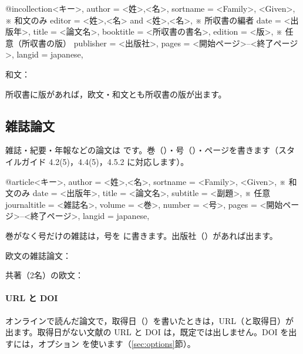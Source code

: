 \begin{bibtemplate}
@incollection{<キー>,
  author    = {<姓>,<名>},
  sortname  = {<Family>, <Given>},   ※ 和文のみ
  editor    = {<姓>,<名> and <姓>,<名>},   ※ 所収書の編者
  date      = {<出版年>},
  title     = {<論文名>},
  booktitle = {<所収書の書名>},
  edition   = {<版>},                ※ 任意（所収書の版）
  publisher = {<出版社>},
  pages     = {<開始ページ>--<終了ページ>},
  langid    = {japanese},
}
\end{bibtemplate}

和文：


所収書に版があれば，欧文・和文とも所収書の版が出ます。


\subsection{雑誌論文}\label{sec:article}
雑誌・紀要・年報などの論文は  です。巻（）・号（）・ページを書きます（スタイルガイド 4.2(5)，4.4(5)，4.5.2 に対応します）。

\begin{bibtemplate}
@article{<キー>,
  author       = {<姓>,<名>},
  sortname     = {<Family>, <Given>},   ※ 和文のみ
  date         = {<出版年>},
  title        = {<論文名>},
  subtitle     = {<副題>},              ※ 任意
  journaltitle = {<雑誌名>},
  volume       = {<巻>},
  number       = {<号>},
  pages        = {<開始ページ>--<終了ページ>},
  langid       = {japanese},
}
\end{bibtemplate}


巻がなく号だけの雑誌は，号を  に書きます。出版社（）があれば出ます。


欧文の雑誌論文：


共著（2名）の欧文：


\paragraph{URL と DOI}
オンラインで読んだ論文で，取得日（）を書いたときは，URL（と取得日）が出ます。取得日がない文献の URL と DOI は，既定では出しません。DOI を出すには，オプション  を使います（\ref{sec:options}節）。

